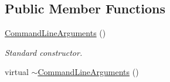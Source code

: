 \subsection*{Public Member Functions}
\begin{DoxyCompactItemize}
\item 
\hypertarget{classfwi_1_1CommandLineArguments_a54afbbabb1a2faf818dedb6fc1901c8d}{\hyperlink{classfwi_1_1CommandLineArguments_a54afbbabb1a2faf818dedb6fc1901c8d}{Command\-Line\-Arguments} ()}\label{classfwi_1_1CommandLineArguments_a54afbbabb1a2faf818dedb6fc1901c8d}

\begin{DoxyCompactList}\small\item\em Standard constructor. \end{DoxyCompactList}\item 
\hypertarget{classfwi_1_1CommandLineArguments_a9eee8e8c9b3a12bcab2ff944a233f041}{virtual \hyperlink{classfwi_1_1CommandLineArguments_a9eee8e8c9b3a12bcab2ff944a233f041}{$\sim$\-Command\-Line\-Arguments} ()}\label{classfwi_1_1CommandLineArguments_a9eee8e8c9b3a12bcab2ff944a233f041}


\end{DoxyCompactItemize}
